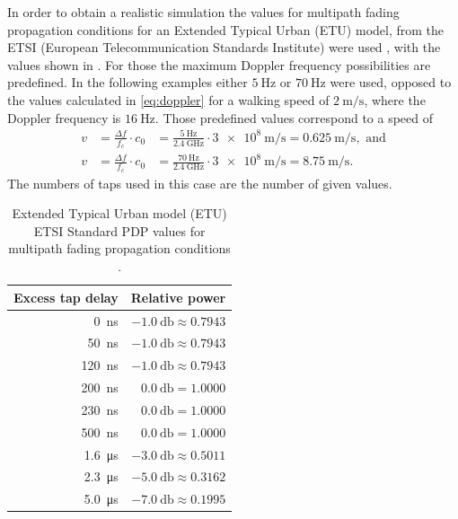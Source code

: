 In order to obtain a realistic simulation the values for multipath fading propagation conditions for an Extended Typical Urban (ETU) model, from the ETSI (European Telecommunication Standards Institute) were used \cite{ETSI}, with the values shown in . For those the maximum Doppler frequency possibilities are predefined. In the following examples  either \(\SI{5}{\hertz}\) or \(\SI{70}{\hertz}\) were used, opposed to the values calculated in \eqref{eq:doppler} for a walking speed of \(\SI{2}{\meter\per\second}\), where the Doppler frequency is \(\SI{16}{\hertz}\). Those predefined values correspond to a speed of
\begin{align}
	v &= \frac{\Delta f}{f_c}\cdot c_0 &= \frac{\SI{5}{\hertz}}{\SI{2.4}{\giga\hertz}}\cdot \SI{3e8}{\meter\per\second}= \SI{0.625}{\meter\per\second}, \text{ and} \\
	v &= \frac{\Delta f}{f_c}\cdot c_0 &= \frac{\SI{70}{\hertz}}{\SI{2.4}{\giga\hertz}}\cdot \SI{3e8}{\meter\per\second}= \SI{8.75}{\meter\per\second}.
\end{align}
The numbers of taps used in this case are the number of given values.

\begin{table}[b]
	\centering
	\begin{tabular}{rr}
		\toprule
		\bfseries Excess tap delay & \bfseries Relative power \\
		\midrule
		\SI{   0}{\nano\second} & \(\SI{-1.0}{\decibel} \approx 0.7943\) \\
		\SI{  50}{\nano\second} & \(\SI{-1.0}{\decibel} \approx 0.7943\) \\
		\SI{ 120}{\nano\second} & \(\SI{-1.0}{\decibel} \approx 0.7943\) \\
		\SI{ 200}{\nano\second} & \(\SI{ 0.0}{\decibel} = 1.0000\) \\
		\SI{ 230}{\nano\second} & \(\SI{ 0.0}{\decibel} = 1.0000\) \\
		\SI{ 500}{\nano\second} & \(\SI{ 0.0}{\decibel} = 1.0000\) \\
		\SI{1.6}{\micro\second} & \(\SI{-3.0}{\decibel} \approx 0.5011\) \\
		\SI{2.3}{\micro\second} & \(\SI{-5.0}{\decibel} \approx 0.3162\) \\
		\SI{5.0}{\micro\second} & \(\SI{-7.0}{\decibel} \approx 0.1995\) \\
		\bottomrule
	\end{tabular}
	\caption{Extended Typical Urban model (ETU) ETSI Standard PDP values for multipath fading propagation conditions \cite{ETSI}. \label{tab:etsi-tap-values}}
\end{table}

